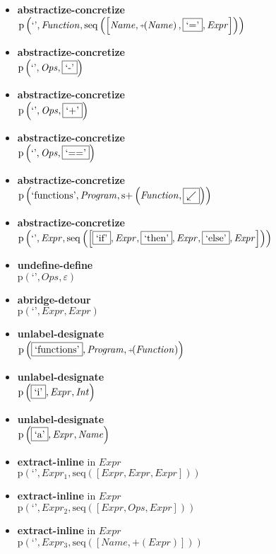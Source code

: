{\begin{itemize}
\item \textbf{abstractize-concretize}\\$\mathrm{p}\left(\text{`'},\mathit{Function},\mathrm{seq}\left(\left[\mathit{Name}, \plus \left(\mathit{Name}\right), \fbox{$\text{`='}$}, \mathit{Expr}\right]\right)\right)$
\item \textbf{abstractize-concretize}\\$\mathrm{p}\left(\text{`'},\mathit{Ops},\fbox{$\text{`-'}$}\right)$
\item \textbf{abstractize-concretize}\\$\mathrm{p}\left(\text{`'},\mathit{Ops},\fbox{$\text{`+'}$}\right)$
\item \textbf{abstractize-concretize}\\$\mathrm{p}\left(\text{`'},\mathit{Ops},\fbox{$\text{`=='}$}\right)$
\item \textbf{abstractize-concretize}\\$\mathrm{p}\left(\text{`functions'},\mathit{Program},\mathrm{s}{+}\left(\mathit{Function},\fbox{${\swarrow}$}\right)\right)$
\item \textbf{abstractize-concretize}\\$\mathrm{p}\left(\text{`'},\mathit{Expr},\mathrm{seq}\left(\left[\fbox{$\text{`if'}$}, \mathit{Expr}, \fbox{$\text{`then'}$}, \mathit{Expr}, \fbox{$\text{`else'}$}, \mathit{Expr}\right]\right)\right)$
\item \textbf{undefine-define}\\$\mathrm{p}\left(\text{`'},\mathit{Ops},\varepsilon\right)$
\item \textbf{abridge-detour}\\$\mathrm{p}\left(\text{`'},\mathit{Expr},\mathit{Expr}\right)$
\item \textbf{unlabel-designate}\\$\mathrm{p}\left(\fbox{\text{`functions'}},\mathit{Program},\plus \left(\mathit{Function}\right)\right)$
\item \textbf{unlabel-designate}\\$\mathrm{p}\left(\fbox{\text{`i'}},\mathit{Expr},\mathit{Int}\right)$
\item \textbf{unlabel-designate}\\$\mathrm{p}\left(\fbox{\text{`a'}},\mathit{Expr},\mathit{Name}\right)$
\item \textbf{extract-inline}  in $\mathit{Expr}$\\$\mathrm{p}\left(\text{`'},\mathit{Expr_1},\mathrm{seq}\left(\left[\mathit{Expr}, \mathit{Expr}, \mathit{Expr}\right]\right)\right)$
\item \textbf{extract-inline}  in $\mathit{Expr}$\\$\mathrm{p}\left(\text{`'},\mathit{Expr_2},\mathrm{seq}\left(\left[\mathit{Expr}, \mathit{Ops}, \mathit{Expr}\right]\right)\right)$
\item \textbf{extract-inline}  in $\mathit{Expr}$\\$\mathrm{p}\left(\text{`'},\mathit{Expr_3},\mathrm{seq}\left(\left[\mathit{Name}, \plus \left(\mathit{Expr}\right)\right]\right)\right)$
\end{itemize}}

